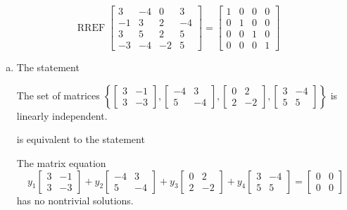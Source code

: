 \begin{exerciseAnswer} 


\[\operatorname{RREF} \left[\begin{array}{cccc}
3 & -4 & 0 & 3 \\
-1 & 3 & 2 & -4 \\
3 & 5 & 2 & 5 \\
-3 & -4 & -2 & 5
\end{array}\right] = \left[\begin{array}{cccc}
1 & 0 & 0 & 0 \\
0 & 1 & 0 & 0 \\
0 & 0 & 1 & 0 \\
0 & 0 & 0 & 1
\end{array}\right] \]


\begin{enumerate}[(a)]
\item The statement 
\begin{center}\begin{minipage}{0.8\textwidth}
 The set of matrices \( \left\{ \left[\begin{array}{cc}
3 & -1 \\
3 & -3
\end{array}\right] , \left[\begin{array}{cc}
-4 & 3 \\
5 & -4
\end{array}\right] , \left[\begin{array}{cc}
0 & 2 \\
2 & -2
\end{array}\right] , \left[\begin{array}{cc}
3 & -4 \\
5 & 5
\end{array}\right] \right\} \) is linearly independent.
\end{minipage}\end{center}
     is equivalent to the statement 
\begin{center}\begin{minipage}{0.8\textwidth}
 The matrix equation \[ y_{1} \left[\begin{array}{cc}
3 & -1 \\
3 & -3
\end{array}\right] + y_{2} \left[\begin{array}{cc}
-4 & 3 \\
5 & -4
\end{array}\right] + y_{3} \left[\begin{array}{cc}
0 & 2 \\
2 & -2
\end{array}\right] + y_{4} \left[\begin{array}{cc}
3 & -4 \\
5 & 5
\end{array}\right] = \left[\begin{array}{cc}
0 & 0 \\
0 & 0
\end{array}\right] \] has no nontrivial solutions. 
\end{minipage}\end{center}
    

\end{enumerate}
\end{exerciseAnswer}
